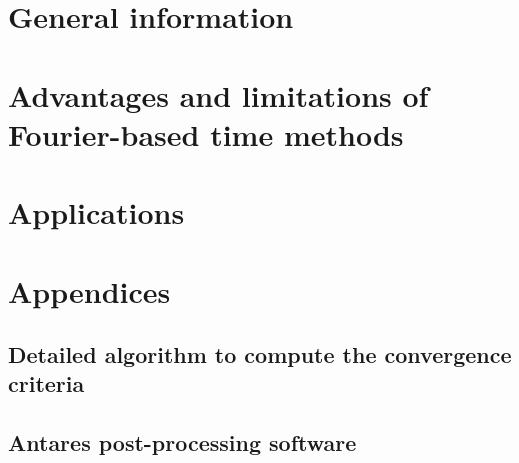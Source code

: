 \documentclass[a4paper, twoside, 11pt, openright]{book}
\begin{document}
\frontmatter

 

\cleardoublepage




\tableofcontents



\mainmatter

\part{General information}
\label{part1}




\part{Advantages and limitations of Fourier-based time methods}
\label{part2}




\part{Applications}
\label{part3}







\appendix

\part*{Appendices}

\chapter{Detailed algorithm to compute the convergence criteria}


\chapter{Antares post-processing software}

\end{document}
